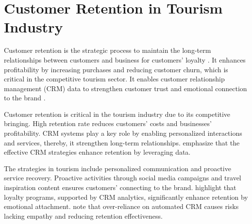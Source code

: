 \section{Customer Retention in Tourism Industry}
Customer retention is the strategic process to maintain the long-term relationships between customers and business for customers' loyalty \cite{Sharma2023CustomerRelationship}. It enhances profitability by increasing purchases and reducing customer churn, which is critical in the competitive tourism sector. It enables customer relationship management (CRM) data to strengthen customer trust and emotional connection to the brand \cite{So2023ServiceQuality}.

Customer retention is critical in the tourism industry due to its competitive bringing. High retention rate reduces customers' costs and businesses' profitability. CRM systems play a key role by enabling personalized interactions and services, thereby, it strengthen long-term relationships. \cite{Sharma2023CustomerRelationship} emphasize that the effective CRM strategies enhance retention by leveraging data.

The strategies in tourism include personalized communication and proactive service recovery. Proactive activities through social media campaigns and travel inspiration content ensures customers' connecting to the brand. \cite{Kim2023LoyaltyPrograms} highlight that loyalty programs, supported by CRM analytics, significantly enhance retention by emotional attachment. \cite{Shafiee2023ServiceRecovery} note that over-reliance on automated CRM causes risks lacking empathy and reducing retention effectiveness. 




